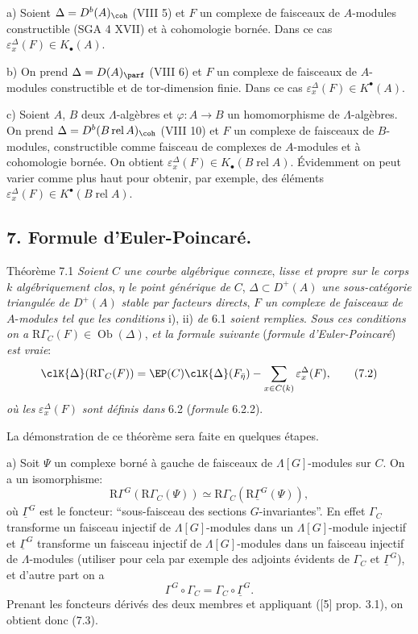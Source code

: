 a) Soient $\Delta=D^b(A)_{\coh}$ (VIII 5) et $F$ un complexe de faisceaux de $A$-modules constructible (SGA 4 XVII) et à cohomologie bornée. Dans ce cas $\varepsilon_x^\Delta(F)\in K_\bullet(A)$.

b) On prend $\Delta=D(A)_{\parf}$ (VIII 6) et $F$ un complexe de faisceaux de $A$-modules constructible et de tor-dimension finie. Dans ce cas $\varepsilon_x^\Delta(F)\in K^{\bullet}(A)$.

c) Soient $A$, $B$ deux $\Lambda$-algèbres et $\varphi:A\to B$ un homomorphisme de $\Lambda$-algèbres. On prend $\Delta=D^b(B\operatorname{ rel }A)_{\coh}$ (VIII 10) et $F$ un complexe de faisceaux de $B$-modules, constructible comme faisceau de complexes de $A$-modules et à cohomologie bornée. On obtient $\varepsilon_x^\Delta(F)\in K_\bullet(B\operatorname{ rel }A)$. Évidemment on peut varier comme plus haut pour obtenir, par exemple, des éléments $\varepsilon_x^\Delta(F)\in K^{\bullet}(B\operatorname{ rel }A)$.

\subsection*{7. Formule d'Euler-Poincaré.}

\begin{statement}{Théorème 7.1}
\emph{Soient} $C$ \emph{une courbe algébrique connexe}, \emph{lisse et propre sur le corps} $k$ \emph{algébriquement clos}, $\eta$ \emph{le point générique de} $C$, $\Delta\subset D^+(A)$ \emph{une sous-catégorie triangulée de} $D^+(A)$ \emph{stable par facteurs directs}, $F$ \emph{un complexe de faisceaux de} $A$-\emph{modules tel que les conditions} i), ii) \emph{de} 6.1 \emph{soient remplies}. \emph{Sous ces conditions on a} $\mathrm{R}\Gamma_C(F)\in\operatorname{Ob}(\Delta)$, \emph{et la formule suivante} (\emph{formule d'Euler-Poincaré}) \emph{est vraie}:
\[
\clK{\Delta}(\mathrm{R}\Gamma_C(F))
=
\EP(C)\clK{\Delta}(F_{\bar\eta})
-\sum_{x\in C(k)}\varepsilon_x^\Delta(F),
\tag{7.2}
\]
\emph{où les} $\varepsilon_x^\Delta(F)$ \emph{sont définis dans} 6.2 (\emph{formule} 6.2.2).
\end{statement}

La
démonstration de ce théorème sera faite en quelques étapes.

a) Soit $\Psi$ un complexe borné à gauche de faisceaux de $\Lambda[G]$-modules sur $C$. On a un isomorphisme:
\[
\mathrm{R}\Gamma^G(\mathrm{R}\Gamma_C(\Psi))\simeq\mathrm{R}\Gamma_C(\mathrm{R}\underline{\Gamma}^G(\Psi)),
\tag{7.3}
\]
où $\underline{\Gamma}^G$ est le foncteur: ``sous-faisceau des sections $G$-invariantes''. En effet $\Gamma_C$ transforme un faisceau injectif de $\Lambda[G]$-modules dans un $\Lambda[G]$-module injectif et $\underline{\Gamma}^G$ transforme un faisceau injectif de $\Lambda[G]$-modules dans un faisceau injectif de $\Lambda$-modules (utiliser pour cela par exemple des adjoints évidents de $\Gamma_C$ et $\underline{\Gamma}^G$), et d'autre part on a
\[
\Gamma^G\circ\Gamma_C=\Gamma_C\circ\underline{\Gamma}^G.
\]
Prenant les foncteurs dérivés des deux membres et appliquant ([5] prop. 3.1), on obtient donc (7.3).

